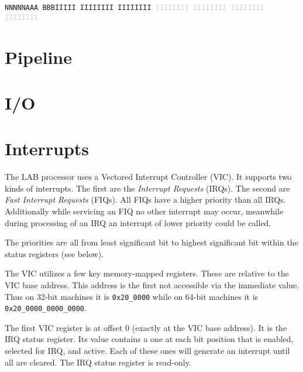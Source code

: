 \documentclass{article}
\begin{document}
\texttt{NNNNNAAA BBBIIIII IIIIIIII IIIIIIII \textcolor{lightgray}{IIIIIIII IIIIIIII IIIIIIII IIIIIIII}}

\section{Pipeline}


\section{I/O}


\section{Interrupts}

The LAB processor uses a Vectored Interrupt Controller (VIC). It supports two
kinds of interrupts. The first are the \textit{Interrupt Requests} (IRQs). The
second are \textit{Fast Interrupt Requests} (FIQs). All FIQs have a higher
priority than all IRQs. Additionally while servicing an FIQ no other interrupt
may occur, meanwhile during processing of an IRQ an interrupt of lower priority
could be called.

The priorities are all from least significant bit to highest significant bit
within the status registers (see below).

The VIC utilizes a few key memory-mapped registers. These are relative to the
VIC base address. This address is the first not accessible via the immediate
value. Thus on 32-bit machines it is \texttt{0x20\_0000} while on 64-bit
machines it is \texttt{0x20\_0000\_0000\_0000}.


The first VIC register is at offset 0 (exactly at the VIC base address). It is
the IRQ status register. Its value contains a one at each bit position that
is enabled, selected for IRQ, and active. Each of these ones will generate an
interrupt until all are cleared. The IRQ status register is read-only.
\end{document}
